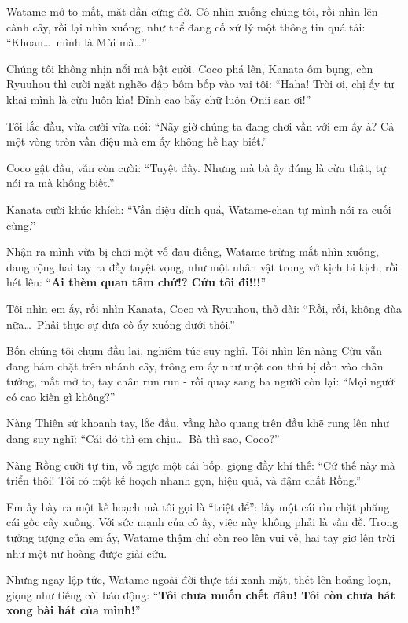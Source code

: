 \documentclass[../main.tex]{subfiles}
\begin{document}
Watame mở to mắt, mặt dần cứng đờ. Cô nhìn xuống chúng tôi, rồi nhìn lên cành cây, rồi lại nhìn xuống, như thể đang cố xử lý một thông tin quá tải: ``Khoan\dots\ mình là Mùi mà\dots''

Chúng tôi không nhịn nổi mà bật cười. Coco phá lên, Kanata ôm bụng, còn Ryuuhou thì cười ngặt nghẽo đập bôm bốp vào vai tôi: ``Haha! Trời ơi, chị ấy tự khai mình là cừu luôn kìa! Đỉnh cao bẫy chữ luôn Onii-san ơi!''

Tôi lắc đầu, vừa cười vừa nói: ``Nãy giờ chúng ta đang chơi vần với em ấy à? Cả một vòng tròn vần điệu mà em ấy không hề hay biết.''

Coco gật đầu, vẫn còn cười: ``Tuyệt đấy. Nhưng mà bà ấy đúng là cừu thật, tự nói ra mà không biết.''

Kanata cười khúc khích: ``Vần điệu đỉnh quá, Watame-chan tự mình nói ra cuối cùng.''

Nhận ra mình vừa bị chơi một vố đau điếng, Watame trừng mắt nhìn xuống, dang rộng hai tay ra đầy tuyệt vọng, như một nhân vật trong vở kịch bi kịch, rồi hét lên: ``\textbf{Ai thèm quan tâm chứ!? Cứu tôi đi!!!}''

Tôi nhìn em ấy, rồi nhìn Kanata, Coco và Ryuuhou, thở dài: ``Rồi, rồi, không đùa nữa\dots\ Phải thực sự đưa cô ấy xuống dưới thôi.''

Bốn chúng tôi chụm đầu lại, nghiêm túc suy nghĩ. Tôi nhìn lên nàng Cừu vẫn đang bám chặt trên nhánh cây, trông em ấy như một con thú bị dồn vào chân tường, mắt mở to, tay chân run run - rồi quay sang ba người còn lại: ``Mọi người có cao kiến gì không?''

Nàng Thiên sứ khoanh tay, lắc đầu, vầng hào quang trên đầu khẽ rung lên như đang suy nghĩ: ``Cái đó thì em chịu\dots\ Bà thì sao, Coco?''

Nàng Rồng cười tự tin, vỗ ngực một cái bốp, giọng đầy khí thế: ``Cứ thế này mà triển thôi! Tôi có một kế hoạch nhanh gọn, hiệu quả, và đậm chất Rồng.''

Em ấy bày ra một kế hoạch mà tôi gọi là ``triệt để'': lấy một cái rìu chặt phăng cái gốc cây xuống. Với sức mạnh của cô ấy, việc này không phải là vấn đề. Trong tưởng tượng của em ấy, Watame thậm chí còn reo lên vui vẻ, hai tay giơ lên trời như một nữ hoàng được giải cứu.


Nhưng ngay lập tức, Watame ngoài đời thực tái xanh mặt, thét lên hoảng loạn, giọng như tiếng còi báo động: ``\textbf{Tôi chưa muốn chết đâu! Tôi còn chưa hát xong bài hát của mình!}''
\end{document}
